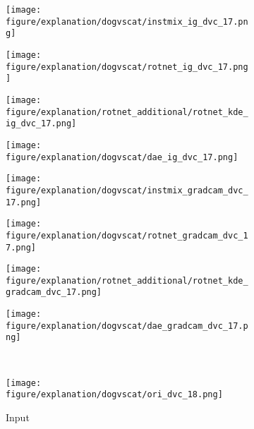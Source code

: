 \documentclass{article} \usepackage{iclr2021_conference,times}
\begin{document}
\begin{figure}[h!]
\begin{subfigure}{.11\textwidth}
  \centering
  \texttt{[image: figure/explanation/dogvscat/instmix\_ig\_dvc\_17.png]}
\end{subfigure}
\hspace{-2mm}
\begin{subfigure}{.11\textwidth}
  \centering
  \texttt{[image: figure/explanation/dogvscat/rotnet\_ig\_dvc\_17.png]}
\end{subfigure}
\hspace{-2mm}
\begin{subfigure}{.11\textwidth}
  \centering
  \texttt{[image: figure/explanation/rotnet\_additional/rotnet\_kde\_ig\_dvc\_17.png]}
\end{subfigure}
\hspace{-2mm}
\begin{subfigure}{.11\textwidth}
  \centering
  \texttt{[image: figure/explanation/dogvscat/dae\_ig\_dvc\_17.png]}
\end{subfigure}
\hspace{-2mm}
\begin{subfigure}{.11\textwidth}
  \centering
  \texttt{[image: figure/explanation/dogvscat/instmix\_gradcam\_dvc\_17.png]}
\end{subfigure}
\hspace{-2mm}
\begin{subfigure}{.11\textwidth}
  \centering
  \texttt{[image: figure/explanation/dogvscat/rotnet\_gradcam\_dvc\_17.png]}
\end{subfigure}
\hspace{-2mm}
\begin{subfigure}{.11\textwidth}
  \centering
  \texttt{[image: figure/explanation/rotnet\_additional/rotnet\_kde\_gradcam\_dvc\_17.png]}
\end{subfigure}
\hspace{-2mm}
\begin{subfigure}{.11\textwidth}
  \centering
  \texttt{[image: figure/explanation/dogvscat/dae\_gradcam\_dvc\_17.png]}
\end{subfigure}\\
\begin{subfigure}{.11\textwidth}
  \centering
  \texttt{[image: figure/explanation/dogvscat/ori\_dvc\_18.png]}
  \caption{Input}
\end{subfigure}
\hspace{-2mm}
\begin{subfigure}{.11\textwidth}

\end{subfigure}
\end{figure}
\end{document}
